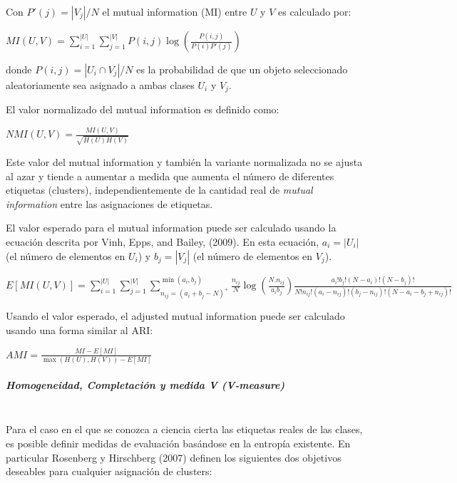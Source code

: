 Con $P'(j) = |V_j| / N$ el mutual information (MI) entre $U$ y $V$ es calculado por:

\begin{center}
	
	$MI(U, V) = \sum_{i=1}^{|U|}\sum_{j=1}^{|V|}P(i, j)\log(\frac{P(i,j)}{P(i)P'(j)})$
\end{center}

donde $P(i, j) = |U_i \cap V_j| /N$ es la probabilidad de que un objeto seleccionado aleatoriamente sea asignado a ambas clases $U_i$ y $V_j$.

El valor normalizado del mutual information es definido como:

\begin{center}
	
	$NMI(U, V) = \frac{MI(U, V)}{\sqrt{H(U)H(V)}}$
	
\end{center}
Este valor del mutual information y también la variante normalizada no se ajusta al azar y tiende a aumentar a medida que aumenta el número de diferentes etiquetas (clusters), independientemente de la cantidad real de \textit{mutual information} entre las asignaciones de etiquetas.

El valor esperado para el mutual information puede ser calculado usando la ecuación descrita por  Vinh, Epps, and Bailey, (2009). En esta ecuación, $a_i = |U_i|$ (el número de elementos en $U_i$) y $b_j = |V_j|$ (el número de elementos en $V_j$).
\begin{center}
	
	$E[MI(U,V)]=\sum_{i=1}^|U| \sum_{j=1}^|V| \sum_{n_{ij}=(a_i+b_j-N)^+ }^{\min(a_i, b_j)} \frac{n_{ij}}{N}\log ( \frac{ N.n_{ij}}{a_i b_j}) \frac{a_i!b_j!(N-a_i)!(N-b_j)!}{N!n_{ij}!(a_i-n_{ij})!(b_j-n_{ij})! (N-a_i-b_j+n_{ij})!}
	$
\end{center}

Usando el valor esperado, el adjusted mutual information puede ser calculado usando una forma similar al ARI:

\begin{center}
	
	$AMI = \frac{MI - E[MI]}{\max(H(U), H(V)) - E[MI]}$
\end{center}
\subparagraph{Homogeneidad, Completación y medida V (V-measure) \\\\}

Para el caso en el que se conozca a ciencia cierta las etiquetas reales de las clases, es posible definir medidas de evaluación basándose en la entropía existente. En particular Rosenberg y Hirschberg (2007) \cite{sesentaiocho} definen los siguientes dos objetivos deseables para cualquier asignación de clusters:

